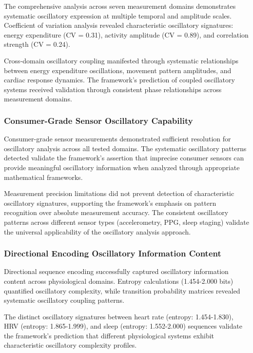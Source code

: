 The comprehensive analysis across seven measurement domains demonstrates systematic oscillatory expression at multiple temporal and amplitude scales. Coefficient of variation analysis revealed characteristic oscillatory signatures: energy expenditure (CV = 0.31), activity amplitude (CV = 0.89), and correlation strength (CV = 0.24).

Cross-domain oscillatory coupling manifested through systematic relationships between energy expenditure oscillations, movement pattern amplitudes, and cardiac response dynamics. The framework's prediction of coupled oscillatory systems received validation through consistent phase relationships across measurement domains.

\subsubsection{Consumer-Grade Sensor Oscillatory Capability}

Consumer-grade sensor measurements demonstrated sufficient resolution for oscillatory analysis across all tested domains. The systematic oscillatory patterns detected validate the framework's assertion that imprecise consumer sensors can provide meaningful oscillatory information when analyzed through appropriate mathematical frameworks.

Measurement precision limitations did not prevent detection of characteristic oscillatory signatures, supporting the framework's emphasis on pattern recognition over absolute measurement accuracy. The consistent oscillatory patterns across different sensor types (accelerometry, PPG, sleep staging) validate the universal applicability of the oscillatory analysis approach.

\subsubsection{Directional Encoding Oscillatory Information Content}

Directional sequence encoding successfully captured oscillatory information content across physiological domains. Entropy calculations (1.454-2.000 bits) quantified oscillatory complexity, while transition probability matrices revealed systematic oscillatory coupling patterns.

The distinct oscillatory signatures between heart rate (entropy: 1.454-1.830), HRV (entropy: 1.865-1.999), and sleep (entropy: 1.552-2.000) sequences validate the framework's prediction that different physiological systems exhibit characteristic oscillatory complexity profiles.


